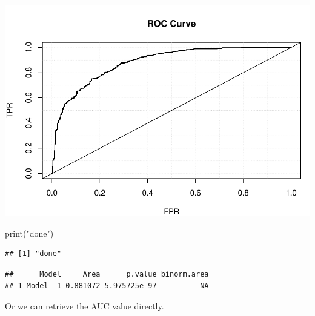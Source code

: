 \documentclass[
]{article}
\newenvironment{Shaded}{\begin{snugshade}}{\end{snugshade}}
\newcommand{\FunctionTok}[1]{\textcolor[rgb]{0.00,0.00,0.00}{#1}}
\newcommand{\NormalTok}[1]{#1}
\newcommand{\OtherTok}[1]{\textcolor[rgb]{0.56,0.35,0.01}{#1}}
\newcommand{\SpecialCharTok}[1]{\textcolor[rgb]{0.00,0.00,0.00}{#1}}
\newcommand{\StringTok}[1]{\textcolor[rgb]{0.31,0.60,0.02}{#1}}
\begin{document}
\includegraphics{PTT_Analysis_of_Test_Scores_Unfinished_files/figure-latex/auc-demo-draft-1.pdf}

\begin{Shaded}
\begin{Highlighting}[]
\FunctionTok{print}\NormalTok{(}\StringTok{"done"}\NormalTok{)}
\end{Highlighting}
\end{Shaded}

\begin{verbatim}
## [1] "done"
\end{verbatim}

\begin{Shaded}
\end{Shaded}

\begin{verbatim}
##      Model     Area      p.value binorm.area
## 1 Model  1 0.881072 5.975725e-97          NA
\end{verbatim}

Or we can retrieve the AUC value directly.

\begin{Shaded}
\end{Shaded}
\end{document}

